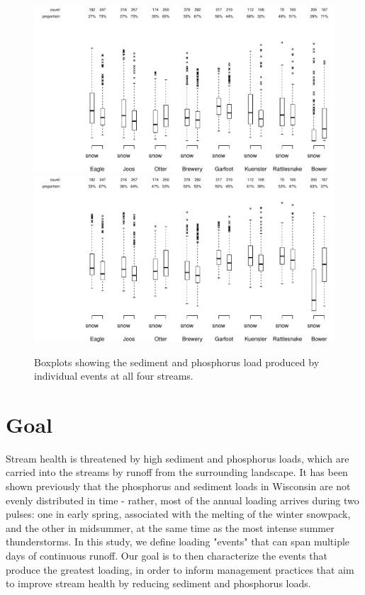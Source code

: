 \documentclass[10pt]{article}
\begin{document}
\begin{figure}[h]
    \begin{center}
\includegraphics{loadings-boxplot_stot}
    \vspace{15mm}
\includegraphics{loadings-boxplot_ptot}
    \caption{Boxplots showing the sediment and phosphorus load produced by individual events at all four streams.\label{boxplots}}
    \end{center}
\end{figure}













\section{Goal}
Stream health is threatened by high sediment and phosphorus loads, which are carried into the streams by runoff from the surrounding landscape. It has been shown previously that the phosphorus and sediment loads in Wisconsin are not evenly distributed in time - rather, most of the annual loading arrives during two pulses: one in early spring, associated with the melting of the winter snowpack, and the other in midsummer, at the same time as the most intense summer thunderstorms. In this study, we define loading "events" that can span multiple days of continuous runoff. Our goal is to then characterize the events that produce the greatest loading, in order to inform management practices that aim to improve stream health by reducing sediment and phosphorus loads.\\
\end{document}
